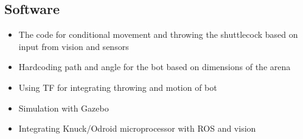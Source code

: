 \documentclass[11pt]{article}
\begin{document}
\subsection{Software}
\begin{itemize}
\item{The code for conditional movement and throwing the shuttlecock based on input from vision and sensors}
\item{Hardcoding path and angle for the bot based on dimensions of the arena}
\item{Using TF for integrating throwing and motion of bot}
\item{Simulation with Gazebo}
\item{Integrating Knuck/Odroid microprocessor with ROS and vision}
\end{itemize}
\end{document}
